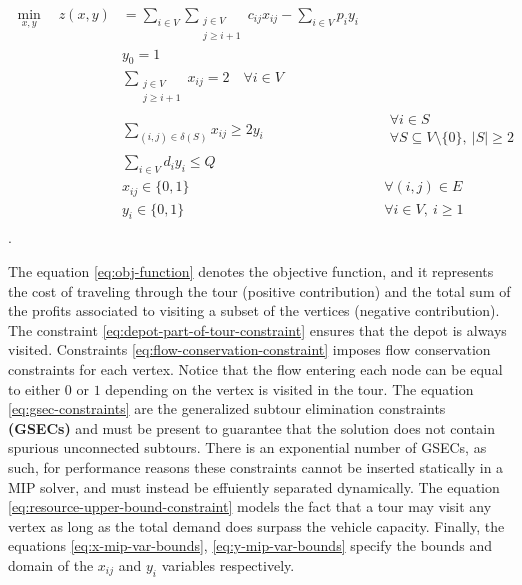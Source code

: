 \begin{align}
	\min_{x,y} \quad z(x, y) & =  \sum_{i \in V} \sum_{\substack{j \in V                                                                                \\ j \ge i + 1}} c_{ij} x_{ij} - \sum_{i \in V} p_i y_i \label{eq:obj-function}\\
	                         & y_0 = 1                                           & \label{eq:depot-part-of-tour-constraint}                             \\
	                         & \sum_{\substack{j \in V                                                                                                  \\ j \ge i + 1}}       x_{ij}    = 2 \quad \forall i \in V         \label{eq:flow-conservation-constraint}\\
	                         & \sum_{(i, j) \in \delta(S)} x_{ij} \ge 2 y_{i}    & \quad \substack{\forall i \in S                                      \\ \forall S \subseteq V \setminus \{ 0 \},\ |S| \ge 2} \label{eq:gsec-constraints} \\
	                         & \sum_{i \in V} d_i y_i   \le Q                    & \label{eq:resource-upper-bound-constraint}                           \\
	                         & x_{ij}                   \in \lbrace 0, 1 \rbrace & \quad \forall (i, j) \in E               \label{eq:x-mip-var-bounds} \\
	                         & y_{i}                    \in \lbrace 0, 1 \rbrace & \quad \forall i \in V,\ i \ge 1          \label{eq:y-mip-var-bounds} \\
\end{align}.


The equation \eqref{eq:obj-function} denotes the objective function, and it represents the cost of traveling through the tour (positive contribution) and the total sum of the profits associated to visiting a subset of the vertices (negative contribution).
The constraint \eqref{eq:depot-part-of-tour-constraint} ensures that the depot is always visited.
Constraints \eqref{eq:flow-conservation-constraint} imposes flow conservation constraints for each vertex.
Notice that the flow entering each node can be equal to either $0$ or $1$ depending on the vertex is visited in the tour.
The equation \eqref{eq:gsec-constraints} are the generalized subtour elimination constraints \textbf{(GSECs)} and must be present to guarantee that the solution does not contain spurious unconnected subtours.
There is an exponential number of GSECs, as such, for performance reasons these constraints cannot be inserted statically in a MIP solver, and must instead be effuiently separated dynamically.
The equation \eqref{eq:resource-upper-bound-constraint} models the fact that a tour may visit any vertex as long as the total demand does surpass the vehicle capacity.
Finally, the equations \eqref{eq:x-mip-var-bounds}, \eqref{eq:y-mip-var-bounds} specify the bounds and domain of the $x_{ij}$ and $y_{i}$ variables respectively.

